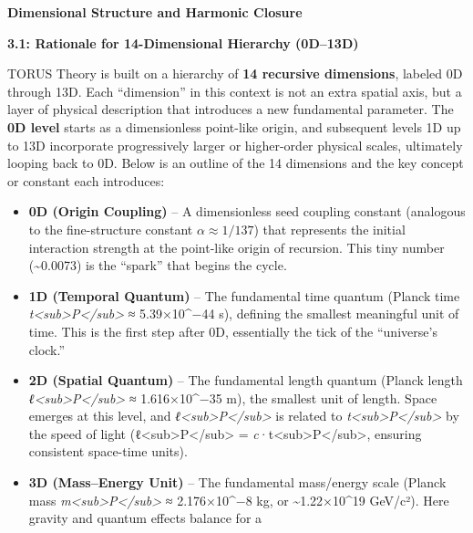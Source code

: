 \documentclass[
]{article}
\begin{document}
\textbf{Dimensional Structure and Harmonic Closure}

\textbf{3.1: Rationale for 14-Dimensional Hierarchy (0D--13D)}

TORUS Theory is built on a hierarchy of \textbf{14 recursive
dimensions}, labeled 0D through 13D. Each ``dimension'' in this context
is not an extra spatial axis, but a layer of physical description that
introduces a new fundamental parameter. The \textbf{0D level} starts as
a dimensionless point-like origin, and subsequent levels 1D up to 13D
incorporate progressively larger or higher-order physical scales,
ultimately looping back to 0D. Below is an outline of the 14 dimensions
and the key concept or constant each introduces:

\begin{itemize}
\item
  \textbf{0D (Origin Coupling)} -- A dimensionless seed coupling
  constant (analogous to the fine-structure constant $\alpha \approx 1/137$) that
  represents the initial interaction strength at the point-like origin
  of recursion\hspace{0pt}. This tiny number (\textasciitilde0.0073) is
  the ``spark'' that begins the cycle.
\item
  \textbf{1D (Temporal Quantum)} -- The fundamental time quantum (Planck
  time \emph{t\textless sub\textgreater P\textless/sub\textgreater{}} ≈
  5.39×10\^{}−44 s), defining the smallest meaningful unit of time. This
  is the first step after 0D, essentially the tick of the ``universe's
  clock.''
\item
  \textbf{2D (Spatial Quantum)} -- The fundamental length quantum
  (Planck length
  \emph{ℓ\textless sub\textgreater P\textless/sub\textgreater{}} ≈
  1.616×10\^{}−35 m), the smallest unit of length\hspace{0pt}. Space
  emerges at this level, and
  \emph{ℓ\textless sub\textgreater P\textless/sub\textgreater{}} is
  related to
  \emph{t\textless sub\textgreater P\textless/sub\textgreater{}} by the
  speed of light
  (ℓ\textless sub\textgreater P\textless/sub\textgreater{} =
  \emph{c}·t\textless sub\textgreater P\textless/sub\textgreater,
  ensuring consistent space-time units).
\item
  \textbf{3D (Mass--Energy Unit)} -- The fundamental mass/energy scale
  (Planck mass
  \emph{m\textless sub\textgreater P\textless/sub\textgreater{}} ≈
  2.176×10\^{}−8 kg, or \textasciitilde1.22×10\^{}19
  GeV/c²)\hspace{0pt}. Here gravity and quantum effects balance for a

\end{itemize}
\end{document}
